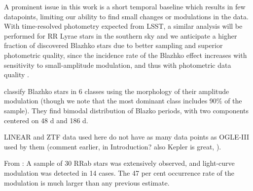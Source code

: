A prominent issue in this work is a short temporal baseline which results in few datapoints, limiting our ability to find small changes or modulations in the data.
With time-resolved photometry expected from LSST, a similar analysis will be performed for
RR Lyrae stars in the southern sky and we anticipate a higher fraction of discovered Blazhko stars due to better sampling
and superior photometric quality, since the incidence rate of the Blazhko effect increases with sensitivity to small-amplitude modulation, and thus with
photometric data quality \citep{2009MNRAS.400.1006J}.


\citep{2020MNRAS.494.1237S} classify Blazhko stars in 6 classes using the morphology of their amplitude modulation
(though we note that the most dominant class includes 90\% of the sample). They find bimodal distribution of Blazko periods, with two components
centered on 48 d and 186 d.

 LINEAR and ZTF data used here do not
 have as many data points as OGLE-III used by them (comment earlier, in Introduction? also Kepler is great, \citep{2010MNRAS.409.1585B}).
 

From \cite{2009MNRAS.400.1006J}: A sample of 30 RRab stars was extensively observed, and light-curve modulation was detected in 14 cases. The 47 per cent occurrence rate of the modulation is much larger than any previous estimate. 